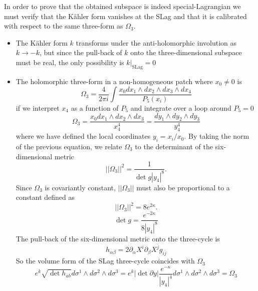 In order to prove that the obtained subspace is indeed special-Lagrangian we must
verify that the Kähler form vanishes at the SLag and that it is calibrated with respect to the
same three-form as $\Omega_3$.
\begin{itemize}
  \item The Kähler form $k$ transforms under the anti-holomorphic involution as $k\to -k$, 
    but since the pull-back of $k$ onto the three-dimensional subspace must be real, 
    the only possibility is $k\rvert_{\mathrm{SLag}}=0$

  \item 
The holomorphic three-form in a non-homogeneous patch where $x_0\neq0$ is
\begin{equation}
  \Omega_3=\frac{4}{2\pi i}\int \frac{x_0 dx_1\wedge dx_2 \wedge dx_3 \wedge dx_4}{P_5(x_i)}
  \label{eq:3form}
\end{equation}
if we interpret $x_4$ as a function of $P_5$ and integrate over a loop around $P_5=0$
\begin{equation}
  \Omega_3=\frac{x_0 dx_1\wedge dx_2 \wedge dx_3}{x_4^4}
  =\frac{dy_1\wedge dy_2\wedge dy_3}{y_4^4}
\end{equation}
where we have defined the local coordinates $y_i=x_i/x_0$.
By taking the norm of the previous equation, we relate $\Omega_3$ to the determinant of the 
six-dimensional metric
\begin{equation}
  ||\Omega_3||^2 = \frac{1}{\det g |y_4|^8}.
\end{equation}
Since $\Omega_3$ is covariantly constant, $||\Omega_3||$ must also be proportional to a constant defined as
\begin{equation}
  ||\Omega_3||^2 = 8e^{2\kappa}.
\end{equation}
\begin{equation}
  \det g = \frac{e^{-2\kappa}}{8|y_4|^8}
\end{equation}
The pull-back of the six-dimensional metric onto the three-cycle is
\begin{equation}
  h_{\alpha\beta}=2\partial_\alpha X^i \partial_\beta X^{\bar j}g_{i\bar j}
\end{equation}
So the volume form of the SLag three-cycle coincides with $\Omega_3$
\begin{equation}
  e^k \sqrt{\det h_{ab}}d\sigma^1\wedge d\sigma^2\wedge d\sigma^3
  =e^k |\det \partial y| \frac{e^{-\kappa}}{|y_4|^4}d\sigma^1\wedge d\sigma^2\wedge d\sigma^3=\Omega_3
\end{equation}
\end{itemize}

